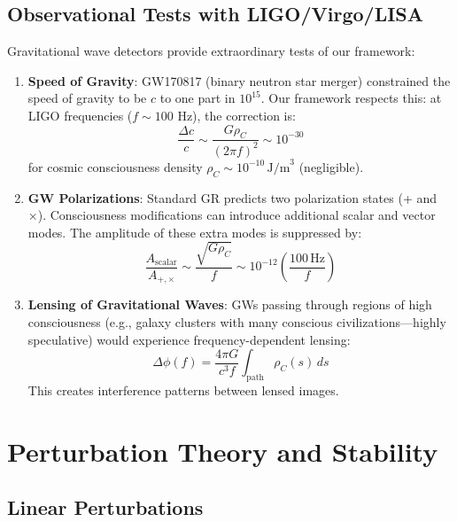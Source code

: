 \subsection{Observational Tests with LIGO/Virgo/LISA}

\begin{level2}
Gravitational wave detectors\cite{abbott2016,ligo2017,lisa2017} provide extraordinary tests of our framework:

\begin{enumerate}
\item \textbf{Speed of Gravity}: GW170817 (binary neutron star merger)\cite{ligo2017,abbott2016} constrained the speed of gravity to be $c$ to one part in $10^{15}$. Our framework respects this: at LIGO frequencies ($f \sim 100$ Hz), the correction is:
\begin{equation}
\frac{\Delta c}{c} \sim \frac{G\rho_C}{(2\pi f)^2} \sim 10^{-30}
\end{equation}
for cosmic consciousness density $\rho_C \sim 10^{-10} \, \text{J/m}^3$ (negligible).

\item \textbf{GW Polarizations}: Standard GR predicts two polarization states (+ and ×). Consciousness modifications can introduce additional scalar and vector modes. The amplitude of these extra modes is suppressed by:
\begin{equation}
\frac{A_{\text{scalar}}}{A_{+,\times}} \sim \frac{\sqrt{G\rho_C}}{f} \sim 10^{-12} \left( \frac{100 \, \text{Hz}}{f} \right)
\end{equation}

\item \textbf{Lensing of Gravitational Waves}: GWs passing through regions of high consciousness (e.g., galaxy clusters with many conscious civilizations---highly speculative) would experience frequency-dependent lensing:
\begin{equation}
\Delta \phi(f) = \frac{4\pi G}{c^3 f} \int_{\text{path}} \rho_C(s) \, ds
\end{equation}
This creates interference patterns between lensed images.
\end{enumerate}
\end{level2}

\section{Perturbation Theory and Stability}

\subsection{Linear Perturbations}


